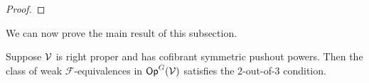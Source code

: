 \documentclass[a4paper,10pt
,draft
]{article}%
\renewcommand{\F}{\mathcal F}
\renewcommand{\1}{\ensuremath{\mathbb{id}}}
\begin{document}
\begin{proof}
\end{proof}

We can now prove the main result of this subsection.
 
\begin{proposition}
      \label{CAV_4.15_PROP}
      \label{2OUTOF3_PROP}
      Suppose $\mathcal V$ is right proper and has cofibrant symmetric pushout powers.
      Then the class of weak $\F$-equivalences in $\mathsf{Op}^G(\mathcal V)$ satisfies the 2-out-of-3 condition.
\end{proposition}
\end{document}
